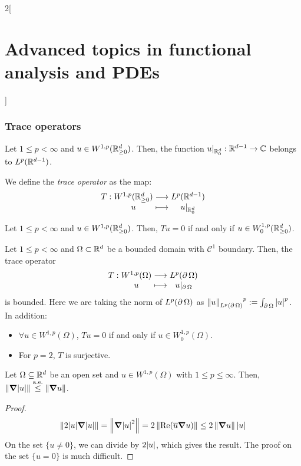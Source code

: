 \documentclass[../../../main_math.tex]{subfiles}
\begin{document}
\begin{multicols}{2}[\section{Advanced topics in functional analysis and PDEs}]
  \subsubsection{Trace operators}
  \begin{theorem}
    Let $1\leq p<\infty$ and $u\in W^{1,p}(\mathbb{R}_{\geq 0}^d)$. Then, the function $u|_{\mathbb{R}_0^d}:\mathbb{R}^{d-1}\to\mathbb{C}$ belongs to $L^p(\mathbb{R}^{d-1})$.
  \end{theorem}
  \begin{definition}
    We define the \emph{trace operator} as the map:
    \begin{align*}
      \function{T}{W^{1,p}(\RR_{\geq 0}^d)}{L^p(\RR^{d-1})}{u}{u|_{\RR_0^d}}
    \end{align*}
  \end{definition}
  \begin{theorem}
    Let $1\leq p<\infty$ and $u\in W^{1,p}(\mathbb{R}_{\geq 0}^d)$. Then, $Tu=0$ if and only if $u\in W_0^{1,p}(\mathbb{R}_{\geq 0}^d)$.
  \end{theorem}
  \begin{theorem}
    Let $1\leq p<\infty$ and $\Omega\subset\mathbb{R}^d$ be a bounded domain with $\mathcal{C}^1$ boundary. Then, the trace operator
    $$
      \function{T}{W^{1,p}(\Omega)}{L^p(\Fr{\Omega})}{u}{u|_{\Fr{\Omega}}}
    $$
    is bounded. Here we are taking the norm of $L^p(\operatorname{\partial}{\Omega})$ as ${\left\|u\right\|_{L^p(\operatorname{\partial}{\Omega})}}^p:=\int_{\operatorname{\partial}{\Omega}}{\abs{u}^p}$. In addition:
    \begin{itemize}
      \item $\forall u\in W^{1,p}(\Omega)$, $Tu=0$ if and only if $u\in W_0^{1,p}(\Omega)$.
      \item For $p=2$, $T$ is surjective.
    \end{itemize}
  \end{theorem}
  \begin{lemma}
    Let $\Omega\subseteq \mathbb{R}^d$ be an open set and $u\in W^{1,p}(\Omega)$ with $1\leq p\leq \infty$. Then, $\left\|\grad \abs{u}\right\|\overset{\text{a.e.}}{\leq}\left\|\grad u\right\|$.
  \end{lemma}
  \begin{proof}
    $$
      \left\|2\abs{u}\grad\abs{u}\right\|=\left\|\grad \abs{u}^2\right\|=2\left\|\Re(\overline{u}\grad u)\right\|\leq 2\left\|\grad u\right\|\abs{u}
    $$
    On the set $\{u\ne 0\}$, we can divide by $2\abs{u}$, which gives the result. The proof on the set $\{u=0\}$ is much difficult.
  \end{proof}
\end{multicols}
\end{document}
